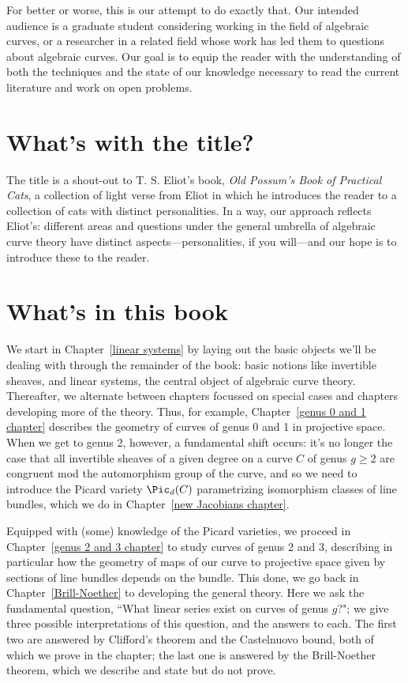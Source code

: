 For better or worse, this is our attempt to do exactly that. Our intended audience is a graduate student considering working in the field of algebraic curves, or a researcher in a related field whose work has led them to questions about algebraic curves. Our goal is to equip the reader with the understanding of both the techniques and the state of our knowledge necessary to read the current literature and work on open problems.

\section{What's with the title?}

The title is a shout-out to T. S. Eliot's book, \emph{Old Possum's Book of Practical Cats}, a collection of light verse from Eliot in which he introduces the reader to a collection of cats with distinct personalities. In a way, our approach reflects Eliot's: different areas and questions under the general umbrella of algebraic curve theory have distinct aspects---personalities, if you will---and our hope is to introduce these to the reader.


\section{What's in this book}

We start in Chapter~\ref{linear systems} by laying out the basic objects we'll be dealing with through the remainder of the book: basic notions like invertible sheaves, and linear systems, the central object of algebraic curve theory. Thereafter, we alternate between chapters focussed on special cases and chapters developing more of the theory. Thus, for example, Chapter~\ref{genus 0 and 1 chapter} describes the geometry of curves of genus 0 and 1 in projective space. When we get to genus 2, however, a fundamental shift occurs: it's no longer the case that all invertible sheaves of a given degree on a curve $C$ of genus $g \geq 2$ are congruent mod the automorphism group of the curve, and so we need to introduce the Picard variety $\Pic_d(C)$ parametrizing isomorphism classes of line bundles, which we do in Chapter~\ref{new Jacobians chapter}.

Equipped with (some) knowledge of the Picard varieties, we proceed in Chapter~\ref{genus 2 and 3 chapter} to study curves of genus 2 and 3, describing in particular how the geometry of maps of our curve to projective space given by sections of line bundles depends on the bundle. This done, we go back in Chapter~\ref{Brill-Noether} to developing the general theory. Here we ask the fundamental question, ``What linear series exist on curves of genus $g$?"; we give three possible interpretations of this question, and the answers to each. The first two are answered by Clifford's theorem and the Castelnuovo bound, both of which we prove in the chapter; the last one is answered by the Brill-Noether theorem, which we describe and state but do not prove.

